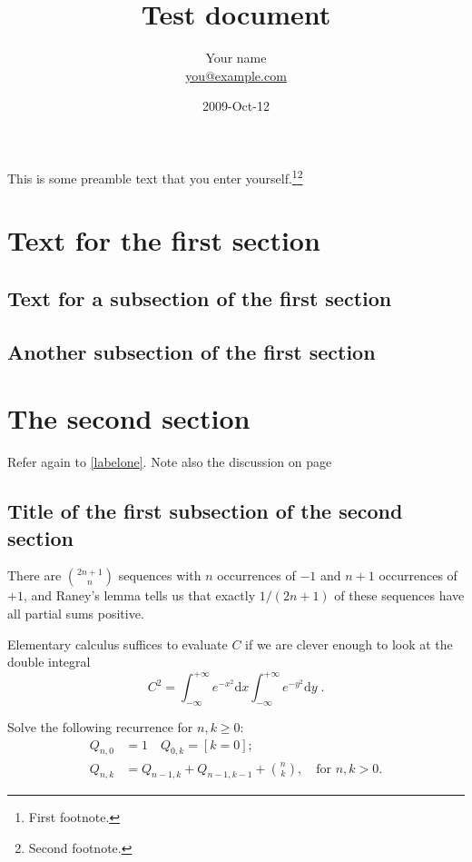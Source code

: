 \documentclass{article}
\title{Test document}
\author{Your name \\ \url{you@example.com}}
\date{2009-Oct-12}
\begin{document}
\maketitle
\tableofcontents
\newpage

This is some preamble text that you enter 
yourself.\footnote{First footnote.}\footnote{Second footnote.}

\section{Text for the first section}
\lipsum[1]

\subsection{Text for a subsection of the first section}
\lipsum[2-3]
\label{labelone}

\subsection{Another subsection of the first section}
\lipsum[4-5]
\label{labeltwo}

\section{The second section}
\lipsum[6]

Refer again to \ref{labelone}.\cite{ConcreteMath}
Note also the discussion on page \pageref{labeltwo}

\subsection{Title of the first subsection of the second section}
\lipsum[7]

There are $\binom{2n+1}{n}$ sequences with $n$ occurrences of 
$-1$ and $n+1$ occurrences of $+1$, and Raney's lemma
tells us that exactly $1/(2n+1)$ of these sequences have all
partial sums positive.

Elementary calculus suffices to evaluate $C$ if we are clever enough
to look at the double integral
\begin{equation*}
  C^2
  =\int_{-\infty}^{+\infty} e^{-x^2} \mathrm{d}x
   \int_{-\infty}^{+\infty} e^{-y^2} \mathrm{d}y\;.
\end{equation*}

Solve the following recurrence for $n,k\geq 0$:
\begin{align*}
  Q_{n,0} &= 1
  \quad Q_{0,k} = [k=0];  \\
  Q_{n,k} &= Q_{n-1,k}+Q_{n-1,k-1}+\binom{n}{k}, \quad\text{for $n,k>0$.}
\end{align*}
\end{document}
